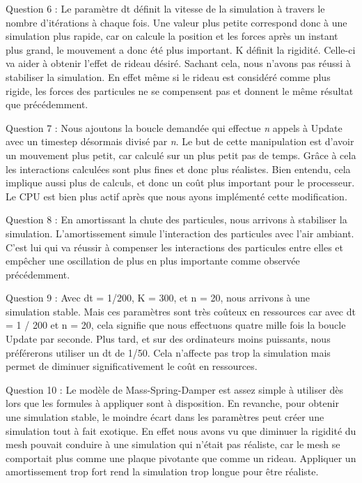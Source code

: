 \documentclass[a4paper,12pt]{article}
\begin{document}
Question 6 : Le paramètre \og{}dt\fg{} définit la vitesse de la simulation à travers le nombre d'itérations à chaque fois. Une valeur plus petite correspond donc à une simulation plus rapide, car on calcule la position et les forces après un instant plus grand, le mouvement a donc été plus important.
K définit la rigidité. Celle-ci va aider à obtenir l'effet de rideau désiré. Sachant cela, nous n'avons pas réussi à stabiliser la simulation. En effet même si le rideau est considéré comme plus rigide, les forces des particules ne se compensent pas et donnent le même résultat que précédemment.

Question 7 : Nous ajoutons la boucle demandée qui effectue \textit{n} appels à \og{}Update\fg{} avec un timestep désormais divisé par \textit{n}. Le but de cette manipulation est d'avoir un mouvement plus petit, car calculé sur un plus petit pas de temps. Grâce à cela les interactions calculées sont plus fines et donc plus réalistes. Bien entendu, cela implique aussi plus de calculs, et donc un coût plus important pour le processeur. Le CPU est bien plus actif après que nous ayons implémenté cette modification. 

Question 8 : En amortissant la chute des particules, nous arrivons à stabiliser la simulation. L'amortissement simule l'interaction des particules avec l'air ambiant. C'est lui qui va réussir à compenser les interactions des particules entre elles et empêcher une oscillation de plus en plus importante comme observée précédemment. 

Question 9 : 	Avec dt = 1/200, K = 300, et n = 20, nous arrivons à une simulation stable. Mais ces paramètres sont très coûteux en ressources car avec dt = 1 / 200 et n = 20, cela signifie que nous effectuons quatre mille fois la boucle \og{}Update\fg{} par seconde. Plus tard, et sur des ordinateurs moins puissants, nous préférerons utiliser un dt de 1/50. Cela n'affecte pas trop la simulation mais permet de diminuer significativement le coût en ressources.

Question 10 : Le modèle de Mass-Spring-Damper est assez simple à utiliser dès lors que les formules à appliquer sont à disposition. En revanche, pour obtenir une simulation stable, le moindre écart dans les paramètres peut créer une simulation tout à fait exotique. En effet nous avons vu que diminuer la rigidité du mesh pouvait conduire à une simulation qui n'était pas réaliste, car le mesh se comportait plus comme une plaque pivotante que comme un rideau. Appliquer un amortissement trop fort rend la simulation trop longue pour être réaliste.
\end{document}
